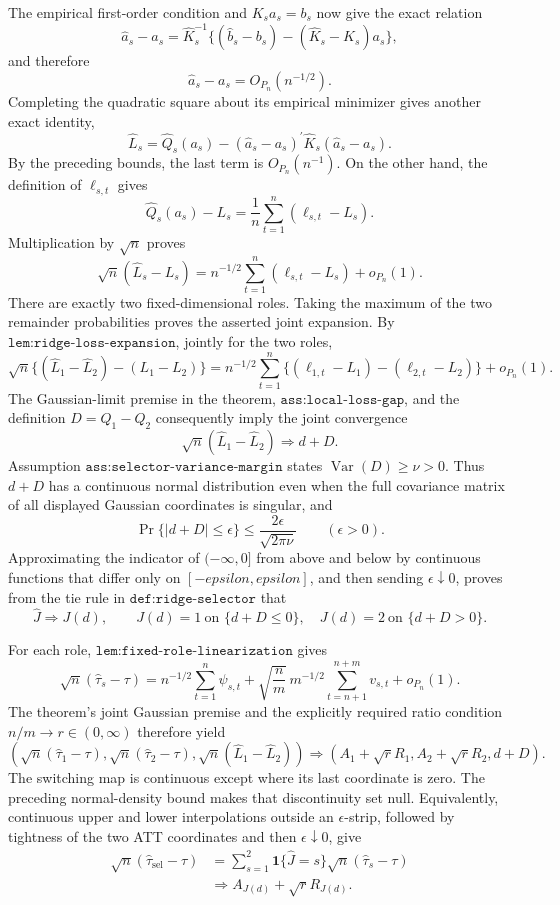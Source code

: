 The empirical first-order condition and \(K_sa_s=b_s\) now give the exact relation
\[
 \widehat a_s-a_s
 =\widehat K_s^{-1}
 \{(\widehat b_s-b_s)-(\widehat K_s-K_s)a_s\},
\]
and therefore
\[
 \widehat a_s-a_s=O_{P_n}(n^{-1/2}).
\]
Completing the quadratic square about its empirical minimizer gives another exact identity,
\[
 \widehat L_s
 =\widehat Q_s(a_s)
  -(\widehat a_s-a_s)^{\prime}\widehat K_s
    (\widehat a_s-a_s).
\]
By the preceding bounds, the last term is \(O_{P_n}(n^{-1})\).  On the other hand, the definition of \(\ell_{s,t}\) gives
\[
 \widehat Q_s(a_s)-L_s
 =\frac1n\sum_{t=1}^n(\ell_{s,t}-L_s).
\]
Multiplication by \(\sqrt n\) proves
\[
 \sqrt n(\widehat L_s-L_s)
 =n^{-1/2}\sum_{t=1}^n(\ell_{s,t}-L_s)+o_{P_n}(1).
\]
There are exactly two fixed-dimensional roles.  Taking the maximum of the two remainder probabilities proves the asserted joint expansion.
By \(\texttt{lem:ridge-loss-expansion}\), jointly for the two roles,
\[
 \sqrt n\{(\widehat L_1-\widehat L_2)-(L_1-L_2)\}
 =n^{-1/2}\sum_{t=1}^n
 \{(\ell_{1,t}-L_1)-(\ell_{2,t}-L_2)\}+o_{P_n}(1).
\]
The Gaussian-limit premise in the theorem, \(\texttt{ass:local-loss-gap}\), and the definition \(D=Q_1-Q_2\) consequently imply the joint convergence
\[
 \sqrt n(\widehat L_1-\widehat L_2)\Rightarrow d+D.
\]
Assumption \(\texttt{ass:selector-variance-margin}\) states \(\operatorname{Var}(D)\geq\nu>0\).  Thus \(d+D\) has a continuous normal distribution even when the full covariance matrix of all displayed Gaussian coordinates is singular, and
\[
 \Pr\{|d+D|\leq\epsilon\}
 \leq \frac{2\epsilon}{\sqrt{2\pi\nu}}
 \qquad(\epsilon>0).
\]
Approximating the indicator of \(( -\infty,0]\) from above and below by continuous functions that differ only on \([-epsilon,epsilon]\), and then sending \(\epsilon\downarrow0\), proves from the tie rule in \(\texttt{def:ridge-selector}\) that
\[
 \widehat J\Rightarrow J(d),
 \qquad
 J(d)=1\ \text{on }\{d+D\leq0\},
 \quad
 J(d)=2\ \text{on }\{d+D>0\}.
\]

For each role, \(\texttt{lem:fixed-role-linearization}\) gives
\[
 \sqrt n(\widehat\tau_s-\tau)
 =n^{-1/2}\sum_{t=1}^n\psi_{s,t}
  +\sqrt{\frac nm}\,m^{-1/2}
    \sum_{t=n+1}^{n+m}v_{s,t}+o_{P_n}(1).
\]
The theorem's joint Gaussian premise and the explicitly required ratio condition \(n/m\to r\in(0,\infty)\) therefore yield
\[
 \left(
  \sqrt n(\widehat\tau_1-\tau),
  \sqrt n(\widehat\tau_2-\tau),
  \sqrt n(\widehat L_1-\widehat L_2)
 \right)
 \Rightarrow
 \left(A_1+\sqrt rR_1,A_2+\sqrt rR_2,d+D\right).
\]
The switching map is continuous except where its last coordinate is zero.  The preceding normal-density bound makes that discontinuity set null.  Equivalently, continuous upper and lower interpolations outside an \(\epsilon\)-strip, followed by tightness of the two ATT coordinates and then \(\epsilon\downarrow0\), give
\[
 \begin{aligned}
 \sqrt n(\widehat\tau_{\mathrm{sel}}-\tau)
 &=\sum_{s=1}^2\mathbf 1\{\widehat J=s\}
   \sqrt n(\widehat\tau_s-\tau)\\
 &\Rightarrow A_{J(d)}+\sqrt rR_{J(d)}.
 \end{aligned}
\]

